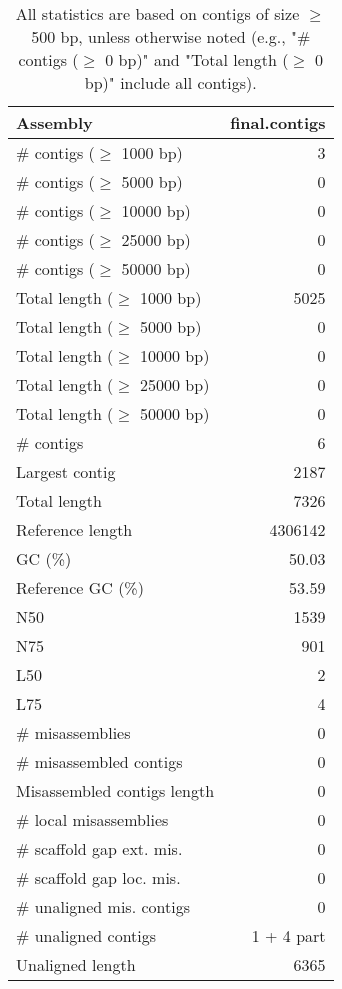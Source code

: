 \documentclass[12pt,a4paper]{article}
\begin{document}
\begin{table}[ht]
\begin{center}
\caption{All statistics are based on contigs of size $\geq$ 500 bp, unless otherwise noted (e.g., "\# contigs ($\geq$ 0 bp)" and "Total length ($\geq$ 0 bp)" include all contigs).}
\begin{tabular}{|l*{1}{|r}|}
\hline
Assembly & final.contigs \\ \hline
\# contigs ($\geq$ 1000 bp) & 3 \\ \hline
\# contigs ($\geq$ 5000 bp) & 0 \\ \hline
\# contigs ($\geq$ 10000 bp) & 0 \\ \hline
\# contigs ($\geq$ 25000 bp) & 0 \\ \hline
\# contigs ($\geq$ 50000 bp) & 0 \\ \hline
Total length ($\geq$ 1000 bp) & 5025 \\ \hline
Total length ($\geq$ 5000 bp) & 0 \\ \hline
Total length ($\geq$ 10000 bp) & 0 \\ \hline
Total length ($\geq$ 25000 bp) & 0 \\ \hline
Total length ($\geq$ 50000 bp) & 0 \\ \hline
\# contigs & 6 \\ \hline
Largest contig & 2187 \\ \hline
Total length & 7326 \\ \hline
Reference length & 4306142 \\ \hline
GC (\%) & 50.03 \\ \hline
Reference GC (\%) & 53.59 \\ \hline
N50 & 1539 \\ \hline
N75 & 901 \\ \hline
L50 & 2 \\ \hline
L75 & 4 \\ \hline
\# misassemblies & 0 \\ \hline
\# misassembled contigs & 0 \\ \hline
Misassembled contigs length & 0 \\ \hline
\# local misassemblies & 0 \\ \hline
\# scaffold gap ext. mis. & 0 \\ \hline
\# scaffold gap loc. mis. & 0 \\ \hline
\# unaligned mis. contigs & 0 \\ \hline
\# unaligned contigs & 1 + 4 part \\ \hline
Unaligned length & 6365 \\ \hline

\end{tabular}
\end{center}
\end{table}
\end{document}
